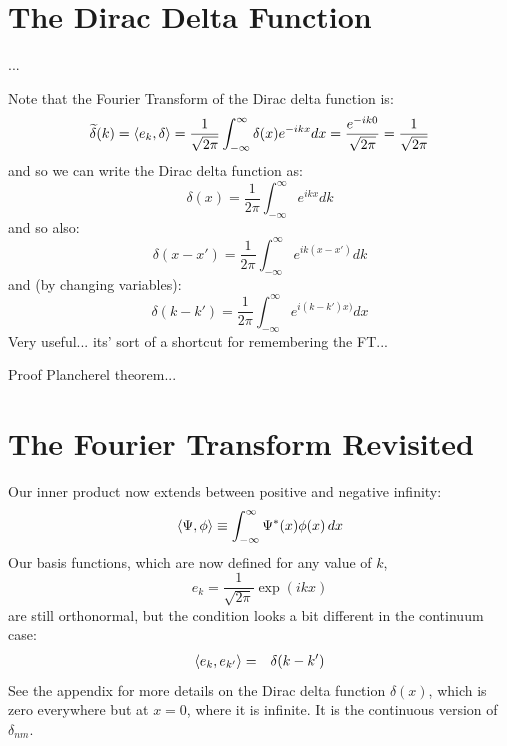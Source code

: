 \documentclass[12pt]{book}
\begin{document}
\section{The Dirac Delta Function}

...

Note that the Fourier Transform of the Dirac delta function is:
$$
\widetilde{\delta}(k) = \braket{e_k, \delta} = \frac{1}{\sqrt{2\pi}} \int_{-\infty}^{\infty} \delta(x) e^{-ikx} dx  = \frac{e^{-ik0}}{\sqrt{2\pi}} = \frac{1}{\sqrt{2\pi}} 
$$
and so we can write the Dirac delta function as:
$$
\delta(x) = \frac{1}{2\pi} \int_{-\infty}^{\infty} e^{ikx} dk
$$
and so also:
$$
\delta(x-x') = \frac{1}{2\pi} \int_{-\infty}^{\infty} e^{ik(x-x')} dk
$$
and (by changing variables):
$$
\delta(k-k') = \frac{1}{2\pi} \int_{-\infty}^{\infty} e^{i(k-k')x)} dx
$$
Very useful...  its' sort of a shortcut for remembering the FT...

Proof Plancherel theorem...










\section{The Fourier Transform Revisited}

Our inner product now extends between positive and negative infinity:
\begin{equation}
\braket{\Psi, \phi} \equiv \int_{-\infty}^{\infty} \Psi^*(x) \phi(x) \, dx
\end{equation}
Our basis functions, which are now defined for any value of $k$,
\begin{equation}
e_k = \frac{1}{\sqrt{2\pi}} \exp(i k x)
\end{equation}
are still orthonormal, but the condition looks a bit different in the continuum case:
\begin{eqnarray*}
\braket{e_k, e_{k'}} &=& \delta(k-k')
\end{eqnarray*}
See the appendix for more details on the Dirac delta function $\delta(x)$, which is zero everywhere but at $x=0$, where it is infinite.  It is the continuous version of $\delta_{nm}$.
\end{document}
